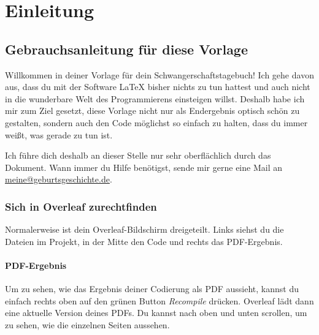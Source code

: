 \part*{Einleitung}


\chapter{Gebrauchsanleitung für diese Vorlage}

Willkommen in deiner Vorlage für dein Schwangerschaftstagebuch! Ich gehe davon aus, dass du mit der Software \LaTeX{} bisher nichts zu tun hattest und auch nicht in die wunderbare Welt des Programmierens einsteigen willst. Deshalb habe ich mir zum Ziel gesetzt, diese Vorlage nicht nur als Endergebnis optisch schön zu gestalten, sondern auch den Code möglichst so einfach zu halten, dass du immer weißt, was gerade zu tun ist.

Ich führe dich deshalb an dieser Stelle nur sehr oberflächlich durch das Dokument. Wann immer du Hilfe benötigst, sende mir gerne eine Mail an \href{mailto:meine@geburtsgeschichte.de}{meine@geburtsgeschichte.de}.

\section{Sich in Overleaf zurechtfinden}

Normalerweise ist dein Overleaf-Bildschirm dreigeteilt. Links siehst du die Dateien im Projekt, in der Mitte den Code und rechts das PDF-Ergebnis.

\subsection{PDF-Ergebnis}
Um zu sehen, wie das Ergebnis deiner Codierung als PDF aussieht, kannst du einfach rechts oben auf den grünen Button \emph{Recompile} drücken. Overleaf lädt dann eine aktuelle Version deines PDFs. Du kannst nach oben und unten scrollen, um zu sehen, wie die einzelnen Seiten aussehen.

